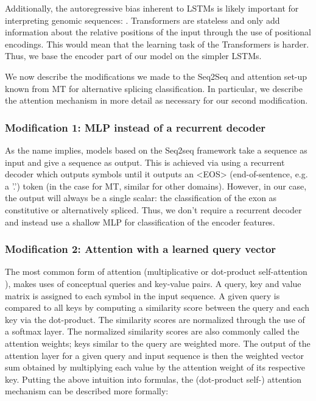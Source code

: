 Additionally, the autoregressive bias inherent to LSTMs is likely important for interpreting genomic sequences: . Transformers are stateless and only add information about the relative positions of the input through the use of positional encodings. This would mean that the learning task of the Transformers is harder. 
Thus, we base the encoder part of our model on the simpler LSTMs. 

We now describe the modifications we made to the Seq2Seq and attention set-up known from MT for alternative splicing classification. In particular, we describe the attention mechanism in more detail as necessary for our second modification.



\subsubsection{Modification 1: MLP instead of a recurrent decoder}
As the name implies, models based on the Seq2seq framework take a sequence as input and give a sequence as output. This is achieved via using a recurrent decoder which outputs symbols until it outputs an <EOS> (end-of-sentence, e.g. a '.') token (in the case for MT, similar for other domains). However, in our case, the output will always be a single scalar: the classification of the exon as constitutive or alternatively spliced. Thus, we don't require a recurrent decoder and instead use a shallow MLP for classification of the encoder features.
\subsubsection{Modification 2: Attention with a learned query vector}
The most common form of attention (multiplicative or dot-product self-attention \cite{allyouneed}), makes uses of conceptual queries and key-value pairs. A query, key and value matrix is assigned to each symbol in the input sequence. A given query is compared to all keys by computing a similarity score between the query and each key via the dot-product. The similarity scores are normalized through the use of a softmax layer. The normalized similarity scores are also commonly called the attention weights; keys similar to the query are weighted more. The output of the attention layer for a given query and input sequence is then the weighted vector sum obtained by multiplying each value by the attention weight of its respective key.
Putting the above intuition into formulas, the (dot-product self-) attention mechanism can be described more formally:

